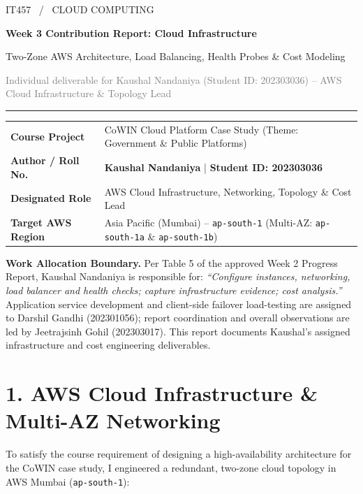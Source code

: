 \documentclass[11pt,a4paper]{article}
\newcommand{\sectionline}[1]{\section*{\color{navy}#1}}
\begin{document}
\thispagestyle{empty}
{\color{teal}\large IT457 \ / \ CLOUD COMPUTING}\par\vspace{6mm}
{\color{navy}\LARGE\bfseries Week 3 Contribution Report: Cloud Infrastructure}\par\vspace{2mm}
{\Large Two-Zone AWS Architecture, Load Balancing, Health Probes \& Cost Modeling}\par\vspace{3mm}
\textcolor{graytext}{Individual deliverable for Kaushal Nandaniya (Student ID: 202303036) -- AWS Cloud Infrastructure \& Topology Lead}\par
\vspace{5mm}\hrule\vspace{5mm}

\begin{tabularx}{\textwidth}{@{}lY@{}}
\textbf{Course Project} & CoWIN Cloud Platform Case Study (Theme: Government \& Public Platforms) \\
\textbf{Author / Roll No.} & \textbf{Kaushal Nandaniya} \quad | \quad \textbf{Student ID: 202303036} \\
\textbf{Designated Role} & AWS Cloud Infrastructure, Networking, Topology \& Cost Lead \\
\textbf{Target AWS Region} & Asia Pacific (Mumbai) -- \texttt{ap-south-1} (Multi-AZ: \texttt{ap-south-1a} \& \texttt{ap-south-1b}) \\
\end{tabularx}
\par\vspace{5mm}

\colorbox{pale}{\parbox{\dimexpr\textwidth-2\fboxsep\relax}{\textbf{Work Allocation Boundary.} Per Table 5 of the approved Week 2 Progress Report, Kaushal Nandaniya is responsible for: \textit{``Configure instances, networking, load balancer and health checks; capture infrastructure evidence; cost analysis.''} Application service development and client-side failover load-testing are assigned to Darshil Gandhi (202301056); report coordination and overall observations are led by Jeetrajsinh Gohil (202303017). This report documents Kaushal's assigned infrastructure and cost engineering deliverables.}}

\sectionline{1. AWS Cloud Infrastructure \& Multi-AZ Networking}
To satisfy the course requirement of designing a high-availability architecture for the CoWIN case study, I engineered a redundant, two-zone cloud topology in AWS Mumbai (\texttt{ap-south-1}):
\end{document}

